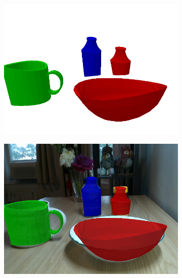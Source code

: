\documentclass{article}
\begin{document}
\begin{figure}[]
\begin{subfigure}{(\linewidth - 0.05\linewidth)/5}
        \includegraphics[width=\linewidth]{figures/real2sim2real/3/3_sim.png}
    \end{subfigure}
    \begin{subfigure}{(\linewidth - 0.05\linewidth)/5}
        \centering
        \includegraphics[width=\linewidth]{figures/real2sim2real/3/3.png}
    \end{subfigure}
    \begin{subfigure}{(\linewidth - 0.05\linewidth)/5}
        \centering

\end{subfigure}
\end{figure}
\end{document}
